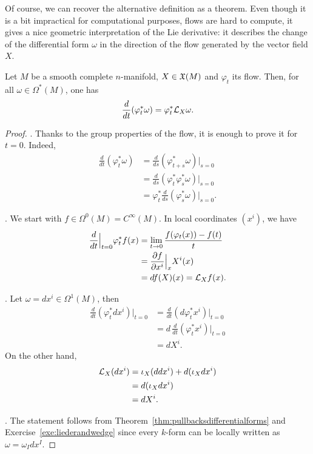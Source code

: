 Of course, we can recover the alternative definition as a theorem.
Even though it is a bit impractical for computational purposes, flows are hard to compute, it gives a nice geometric interpretation of the Lie derivative: it describes the change of the differential form $\omega$ in the direction of the flow generated by the vector field $X$.

\begin{theorem}\label{thm:LieDerivativeFlow}
  Let $M$ be a smooth complete $n$-manifold, $X\in\mathfrak{X}(M)$ and $\varphi_t$ its flow.
  Then, for all $\omega\in \Omega^*(M)$, one has
  \begin{equation}
    \frac{d}{dt}(\varphi_t^* \omega) = \varphi_t^*\mathcal{L}_X\omega.
  \end{equation}
\end{theorem}
\begin{proof}
  .
  Thanks to the group properties of the flow, it is enough to prove it for $t=0$.
  Indeed,
  \begin{align}
    \frac{d}{dt}(\varphi_t^* \omega)
    &= \frac{d}{ds}(\varphi_{t+s}^* \omega)\Big|_{s=0} \\
    &= \frac{d}{ds}(\varphi_t^*\varphi_s^*\omega)\Big|_{s=0} \\
    &= \varphi^*_t \frac{d}{ds}(\varphi_s^*\omega)\Big|_{s=0}.
  \end{align}

  .
  We start with $f\in\Omega^0(M) = C^\infty(M)$.
  In local coordinates $(x^i)$, we have
  \begin{align}
    \frac{d}{dt}\Big|_{t=0}\varphi_t^* f(x) 
    &= \lim_{t\to0} \frac{f(\varphi_t(x)) - f(t)}{t} \\
    &= \frac{\partial f}{\partial x^i}\Big|_x X^i(x) \\
    &= df(X)(x) = \mathcal{L}_X f(x).
  \end{align} 

  . Let $\omega = dx^i \in \Omega^1(M)$, then
  \begin{align}
    \frac{d}{dt}(\varphi_t^* dx^i)\Big|_{t=0}
    &= \frac{d}{dt}(d\varphi_t^* x^i)\Big|_{t=0} \\
    &= d\, \frac{d}{dt}(\varphi_t^* x^i)\Big|_{t=0} \\
    &= dX^i.
  \end{align}
  On the other hand,
  \begin{align}
    \mathcal{L}_X(dx^i)
    &= \iota_X(ddx^i) + d(\iota_X dx^i)\\
    &= d(\iota_X dx^i) \\
    &= dX^i.
  \end{align}

  . The statement follows from Theorem~\ref{thm:pullbacksdifferentialforms} and Exercise~\ref{exe:liederandwedge} since every $k$-form can be locally written as $\omega = \omega_I dx^I$.
\end{proof}


